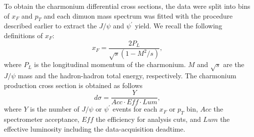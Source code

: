 \documentclass[reprint,aps,unsortedaddress,superscriptaddress,prl,floatfix,showpacs,linenumbers]{revtex4-2}
\begin{document}

To obtain the charmonium differential cross sections,
the data were split into bins of $x_F$ and $p_T$ and each dimuon mass
spectrum was fitted with the procedure described earlier
to extract the $J/\psi$ and $\psi^\prime$ yield.
We recall the following definitions of $x_F$:
\begin{equation}
	x_F = \frac{2P_L}{\sqrt{s} (1-M^2/s)},
	\label{eq:eq1}
\end{equation}
where $P_L$ is the longitudinal momentum of the charmonium.
$M$ and $\sqrt s$ are the $J/\psi$ mass and the hadron-hadron total
energy, respectively.
The charmonium production cross section is obtained as follows
\begin{equation}
	d\sigma = \frac{Y}{Acc \cdot Eff \cdot Lum},
	\label{eq:eq2}
\end{equation}
where $Y$ is the number of $J/\psi$ or $\psi^\prime$ events
for each $x_F$ or $p_T$ bin, $Acc$ the spectrometer acceptance,
$Eff$ the efficiency for  analysis cuts, and $Lum$ the effective
luminosity including the data-acquisition deadtime.
\end{document}
